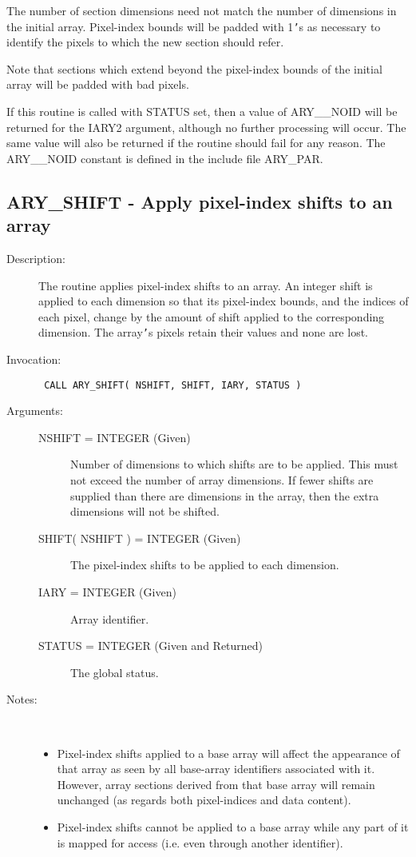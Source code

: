 \documentclass[twoside,11pt]{article}
\newcommand{\xlabel}[1]{}
\newlength{\sstbannerlength}
\newlength{\sstcaptionlength}
\newlength{\sstexampleslength}
\newlength{\sstexampleswidth}
\newcommand{\sstroutine}[3]{
   \goodbreak
   \rule{\textwidth}{0.5mm}
   \vspace{-7ex}
   \newline
   \settowidth{\sstbannerlength}{{\Large {\bf #1}}}
   \setlength{\sstcaptionlength}{\textwidth}
   \setlength{\sstexampleslength}{\textwidth}
   \addtolength{\sstbannerlength}{0.5em}
   \addtolength{\sstcaptionlength}{-2.0\sstbannerlength}
   \addtolength{\sstcaptionlength}{-5.0pt}
   \settowidth{\sstexampleswidth}{{\bf Examples:}}
   \addtolength{\sstexampleslength}{-\sstexampleswidth}
   \parbox[t]{\sstbannerlength}{\flushleft{\Large {\bf #1}}}
   \parbox[t]{\sstcaptionlength}{\center{\Large #2}}
   \parbox[t]{\sstbannerlength}{\flushright{\Large {\bf #1}}}
   \begin{description}
      #3
   \end{description}
}
\newcommand{\sstdescription}[1]{\item[Description:] #1}
\newcommand{\sstinvocation}[1]{\item[Invocation:]\hspace{0.4em}{\tt #1}}
\newcommand{\sstarguments}[1]{
   \item[Arguments:] \mbox{} \\
   \vspace{-3.5ex}
   \begin{description}
      #1
   \end{description}
}
\newcommand{\sstsubsection}[1]{ \item[{#1}] \mbox{} \\}
\newcommand{\sstnotes}[1]{\item[Notes:] \mbox{} \\[1.3ex] #1}
\newcommand{\sstitemlist}[1]{
  \mbox{} \\
  \vspace{-3.5ex}
  \begin{itemize}
     #1
  \end{itemize}
}
\newcommand{\sstitem}{\item}
\newcommand{\ssttt}{\tt}
\renewcommand{\sstroutine}[3]{
      \subsection{#1\xlabel{#1}-\label{#1}#2}
      \begin{description}
         #3
      \end{description}
   }
\renewcommand{\sstdescription}[1]{\item[Description:]
      \begin{description}
         #1
      \end{description}
   }
\renewcommand{\sstinvocation}[1]{\item[Invocation:]
      \begin{description}
         {\ssttt #1}
      \end{description}
   }
\renewcommand{\sstarguments}[1]{
      \item[Arguments:]
      \begin{description}
         #1
      \end{description}
   }
\renewcommand{\sstsubsection}[1]{\item[{#1}]}
\renewcommand{\sstnotes}[1]{\item[Notes:]
      \begin{description}
         #1
      \end{description}
   }
\newcommand{\sstitemlist}[1]{
      \begin{itemize}
         #1
      \end{itemize}
   }
\begin{document}
\begin{eqn*}
{{{         \sstitem
         The number of section dimensions need not match the number of
         dimensions in the initial array. Pixel-index bounds will be
         padded with 1{\tt '}s as necessary to identify the pixels to which the
         new section should refer.

         \sstitem
         Note that sections which extend beyond the pixel-index bounds
         of the initial array will be padded with bad pixels.

         \sstitem
         If this routine is called with STATUS set, then a value of
         ARY\_\_NOID will be returned for the IARY2 argument, although no
         further processing will occur. The same value will also be
         returned if the routine should fail for any reason. The ARY\_\_NOID
         constant is defined in the include file ARY\_PAR.
      }
   }
}
\sstroutine{
   ARY\_SHIFT
}{
   Apply pixel-index shifts to an array
}{
   \sstdescription{
      The routine applies pixel-index shifts to an array. An integer
      shift is applied to each dimension so that its pixel-index
      bounds, and the indices of each pixel, change by the amount of
      shift applied to the corresponding dimension. The array{\tt '}s pixels
      retain their values and none are lost.
   }
   \sstinvocation{
      CALL ARY\_SHIFT( NSHIFT, SHIFT, IARY, STATUS )
   }
   \sstarguments{
      \sstsubsection{
         NSHIFT = INTEGER (Given)
      }{
         Number of dimensions to which shifts are to be applied. This
         must not exceed the number of array dimensions. If fewer
         shifts are supplied than there are dimensions in the array,
         then the extra dimensions will not be shifted.
      }
      \sstsubsection{
         SHIFT( NSHIFT ) = INTEGER (Given)
      }{
         The pixel-index shifts to be applied to each dimension.
      }
      \sstsubsection{
         IARY = INTEGER (Given)
      }{
         Array identifier.
      }
      \sstsubsection{
         STATUS = INTEGER (Given and Returned)
      }{
         The global status.
      }
   }
   \sstnotes{
      \sstitemlist{

         \sstitem
         Pixel-index shifts applied to a base array will affect the
         appearance of that array as seen by all base-array identifiers
         associated with it. However, array sections derived from that
         base array will remain unchanged (as regards both pixel-indices
         and data content).

         \sstitem
         Pixel-index shifts cannot be applied to a base array while any
         part of it is mapped for access (i.e. even through another
         identifier).

}}}
\end{eqn*}
\end{document}
